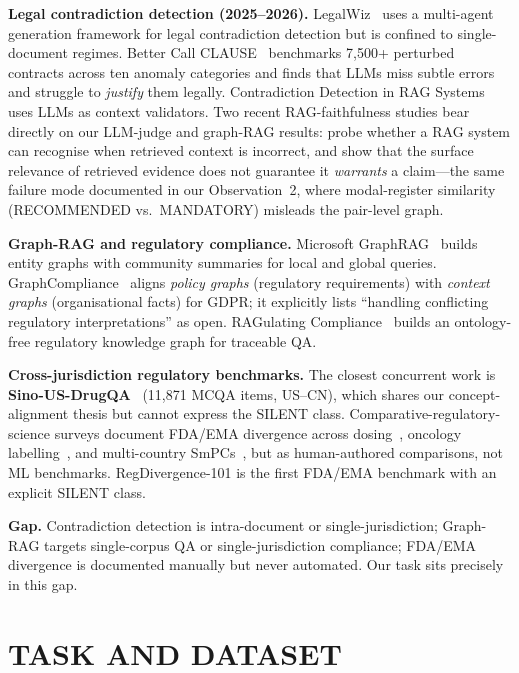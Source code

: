 \documentclass[manuscript]{acmart}
\makeatletter
\let\@acmt@@section\section
\renewcommand{\section}[1]{%
  \@acmt@@section{\texorpdfstring{\MakeUppercase{#1}}{#1}}}
\makeatother
\begin{document}
\textbf{Legal contradiction detection (2025--2026).}
LegalWiz~\cite{legalwiz2025} uses a multi-agent generation framework for legal
contradiction detection but is confined to single-document regimes. Better Call
CLAUSE~\cite{betterclause2026} benchmarks 7,500+
perturbed contracts across ten anomaly categories and finds that LLMs miss
subtle errors and struggle to \textit{justify} them legally. Contradiction
Detection in RAG Systems~\cite{contradictionrag2025} uses LLMs as context
validators. Two recent RAG-faithfulness studies bear directly on our LLM-judge
and graph-RAG results: \citet{chen2026ragwrong} probe whether a RAG system can
recognise when retrieved context is incorrect, and \citet{qian2026evidenceforce}
show that the surface relevance of retrieved evidence does not guarantee it
\textit{warrants} a claim---the same failure mode documented in our Observation~2, where
modal-register similarity (RECOMMENDED vs.\ MANDATORY) misleads the pair-level
graph.

\textbf{Graph-RAG and regulatory compliance.}
Microsoft GraphRAG~\cite{edge2024graphrag} builds entity graphs with community
summaries for local and global queries. GraphCompliance~\cite{graphcompliance2025}
aligns \textit{policy graphs} (regulatory requirements) with \textit{context
graphs} (organisational facts) for GDPR; it explicitly lists ``handling
conflicting regulatory interpretations'' as open. RAGulating
Compliance~\cite{ragulating2025} builds an ontology-free regulatory knowledge
graph for traceable QA.

\textbf{Cross-jurisdiction regulatory benchmarks.}
The closest concurrent work is \textbf{Sino-US-DrugQA}~\cite{sinousdrugqa2026}
(11{,}871 MCQA items, US--CN), which shares our concept-alignment thesis but
cannot express the SILENT class. Comparative-regulatory-science surveys document
FDA/EMA divergence across dosing~\cite{mita2026doses}, oncology
labelling~\cite{gomezfernandez2026inhibitors}, and multi-country
SmPCs~\cite{pvverse2026}, but as human-authored comparisons, not ML benchmarks.
RegDivergence-101 is the first FDA/EMA benchmark with an explicit SILENT class.

\textbf{Gap.} Contradiction detection is intra-document or
single-jurisdiction; Graph-RAG targets single-corpus QA or
single-jurisdiction compliance; FDA/EMA divergence is documented manually but
never automated. Our task sits precisely in this gap.

\section{Task and Dataset}
\end{document}

